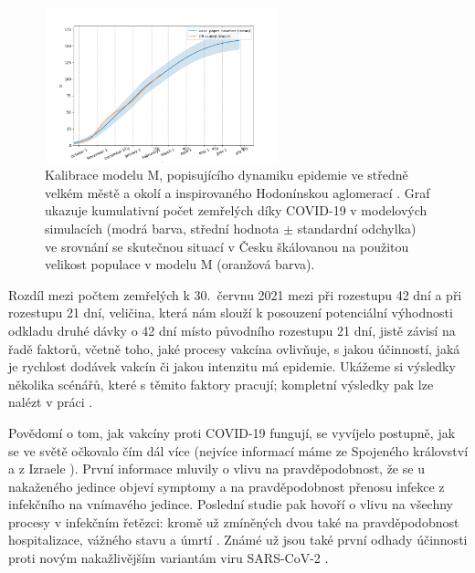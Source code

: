\begin{figure}[h]
	\centering
	\includegraphics[width=0.6\textwidth]{pic/death_vacc_d.png}
	\caption{Kalibrace modelu M, popisujícího dynamiku epidemie ve středně velkém městě a okolí a inspirovaného Hodonínskou aglomerací \cite{M-techrep2021}. Graf ukazuje kumulativní počet zemřelých díky COVID-19 v modelových simulacích (modrá barva, střední hodnota $\pm$ standardní odchylka) ve srovnání se skutečnou situací v Česku škálovanou na použitou velikost populace v modelu M (oranžová barva).}
	\label{kalibraceM}
\end{figure}

Rozdíl mezi počtem zemřelých k 30.\ červnu 2021 mezi při rozestupu 42 dní a při rozestupu 21 dní, veličina, která nám slouží k posouzení potenciální výhodnosti odkladu druhé dávky o 42 dní místo původního rozestupu 21 dní, jistě závisí na řadě faktorů, včetně toho, jaké procesy vakcína ovlivňuje, s jakou účinností, jaká je rychlost dodávek vakcín či jakou intenzitu má epidemie. Ukážeme si výsledky několika scénářů, které s těmito faktory pracují; kompletní výsledky pak lze nalézt v práci \cite{vaccpaper}.

Povědomí o tom, jak vakcíny proti COVID-19 fungují, se vyvíjelo postupně, jak se ve světě očkovalo čím dál více (nejvíce informací máme ze Spojeného království \cite{Hall_etal2021,Vasileiou_etal2021} a z Izraele \cite{Haas_etal2021}). První informace mluvily o vlivu na pravděpodobnost, že se u nakaženého jedince objeví symptomy a na pravděpodobnost přenosu infekce z infekčního na vnímavého jedince. Poslední studie pak hovoří o vlivu na všechny procesy v infekčním řetězci: kromě už zmíněných dvou také na pravděpodobnost hospitalizace, vážného stavu a úmrtí \cite{Haas_etal2021}. Známé už jsou také první odhady účinnosti proti novým nakažlivějším variantám viru SARS-CoV-2 \cite[a reference uvnitř]{Shapiro_etal2021,delta}. 

